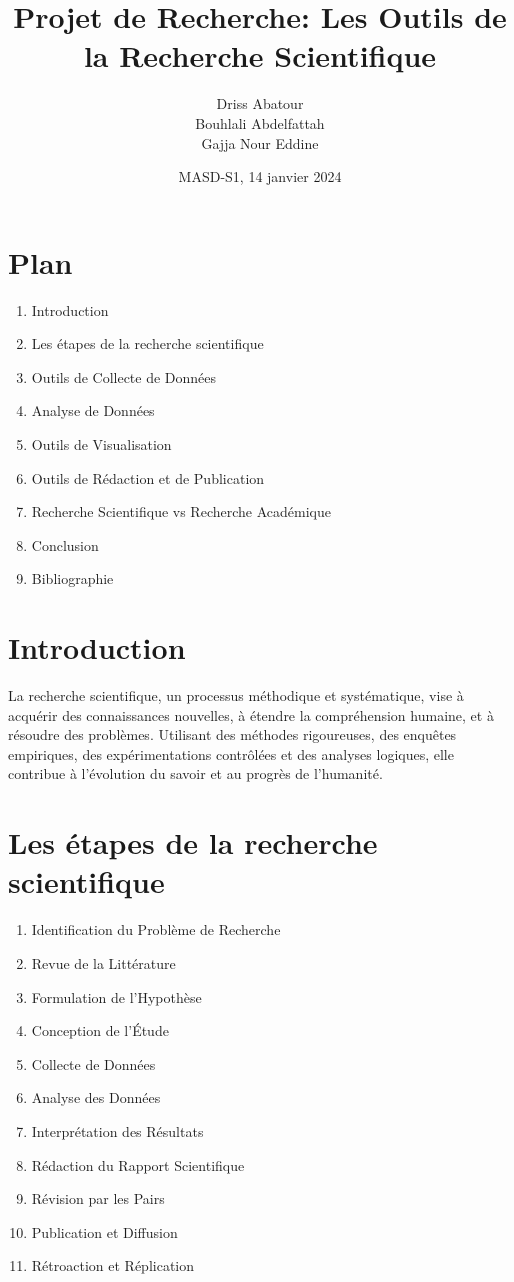 \documentclass{article}
\begin{document}
\title{Projet de Recherche: Les Outils de la Recherche Scientifique}
\author{Driss Abatour \\ Bouhlali Abdelfattah \\ Gajja Nour Eddine}
\date{MASD-S1, 14 janvier 2024}
\maketitle

\section*{Plan}
\begin{enumerate}
    \item Introduction
    \item Les étapes de la recherche scientifique
    \item Outils de Collecte de Données
    \item Analyse de Données
    \item Outils de Visualisation
    \item Outils de Rédaction et de Publication
    \item Recherche Scientifique vs Recherche Académique
    \item Conclusion
    \item Bibliographie
\end{enumerate}

\section*{Introduction}
La recherche scientifique, un processus méthodique et systématique, vise à acquérir des connaissances nouvelles, à étendre la compréhension humaine, et à résoudre des problèmes. Utilisant des méthodes rigoureuses, des enquêtes empiriques, des expérimentations contrôlées et des analyses logiques, elle contribue à l'évolution du savoir et au progrès de l'humanité.

\section*{Les étapes de la recherche scientifique}
\begin{enumerate}[label=\arabic*.]
    \item Identification du Problème de Recherche
    \item Revue de la Littérature
    \item Formulation de l'Hypothèse
    \item Conception de l'Étude
    \item Collecte de Données
    \item Analyse des Données
    \item Interprétation des Résultats
    \item Rédaction du Rapport Scientifique
    \item Révision par les Pairs
    \item Publication et Diffusion
    \item Rétroaction et Réplication
\end{enumerate}
\end{document}
